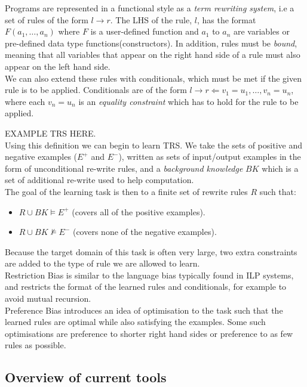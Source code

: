 Programs are represented in a functional style as a \textit{term rewriting system}, i.e a set of rules of the form $l \rightarrow r$. The LHS of the rule, $l$, has the format $F(a_1, \dots, a_n)$ where $F$ is a user-defined function and $a_1$ to $a_n$ are variables or pre-defined data type functions(constructors). In addition, rules must be \textit{bound}, meaning that all variables that appear on the right hand side of a rule must also appear on the left hand side.\\

We can also extend these rules with conditionals, which must be met if the given rule is to be applied. Conditionals are of the form $l \rightarrow r \Leftarrow v_1 = u_1, \dots, v_n = u_n$, where each $v_n = u_n$ is an \textit{equality constraint} which has to hold for the rule to be applied.

EXAMPLE TRS HERE.\\

Using this definition we can begin to learn TRS. We take the sets of positive and negative examples ($E^+$ and $E^-$), written as sets of input/output examples in the form of unconditional re-write rules, and a \textit{background knowledge} $BK$ which is a set of additional re-write used to help computation. \\

The goal of the learning task is then to a finite set of rewrite rules $R$ such that:

\begin{itemize}
\item $R \cup BK \models E^+$ (covers all of the positive examples).
\item $R \cup BK \not \models E^-$ (covers none of the negative examples).
\end{itemize}

Because the target domain of this task is often very large, two extra constraints are added to the type of rule we are allowed to learn.\\
Restriction Bias is similar to the language bias typically found in ILP systems, and restricts the format of the learned rules and conditionals, for example to avoid mutual recursion. \\
Preference Bias introduces an idea of optimisation to the task such that the learned rules are optimal while also satisfying the examples. Some such optimisations are preference to shorter right hand sides or preference to as few rules as possible.

\subsection{Overview of current tools}

